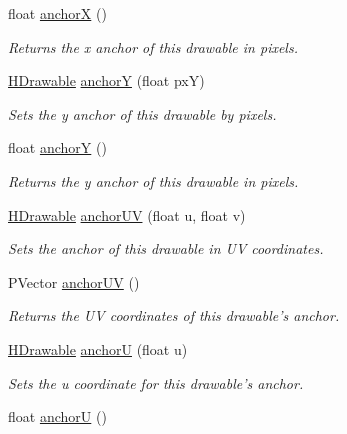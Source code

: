 \begin{DoxyCompactItemize}
float \hyperlink{classhype_1_1core_1_1drawable_1_1_h_drawable_a9bb0273629e7f72853ef8f304bc7f231}{anchor\-X} ()
\begin{DoxyCompactList}\small\item\em Returns the x anchor of this drawable in pixels. \end{DoxyCompactList}\item 
\hyperlink{classhype_1_1core_1_1drawable_1_1_h_drawable}{H\-Drawable} \hyperlink{classhype_1_1core_1_1drawable_1_1_h_drawable_a2e8e72269b9adbd51937bbc8a9dfb3ff}{anchor\-Y} (float px\-Y)
\begin{DoxyCompactList}\small\item\em Sets the y anchor of this drawable by pixels. \end{DoxyCompactList}\item 
float \hyperlink{classhype_1_1core_1_1drawable_1_1_h_drawable_a3fc39833727f9bd6f1c886619fe977f2}{anchor\-Y} ()
\begin{DoxyCompactList}\small\item\em Returns the y anchor of this drawable in pixels. \end{DoxyCompactList}\item 
\hyperlink{classhype_1_1core_1_1drawable_1_1_h_drawable}{H\-Drawable} \hyperlink{classhype_1_1core_1_1drawable_1_1_h_drawable_a1c0b97d90da4d7ee5c396e23f98f6017}{anchor\-U\-V} (float u, float v)
\begin{DoxyCompactList}\small\item\em Sets the anchor of this drawable in U\-V coordinates. \end{DoxyCompactList}\item 
P\-Vector \hyperlink{classhype_1_1core_1_1drawable_1_1_h_drawable_ab19047f4bb1181ccd155741ebe6e501f}{anchor\-U\-V} ()
\begin{DoxyCompactList}\small\item\em Returns the U\-V coordinates of this drawable's anchor. \end{DoxyCompactList}\item 
\hyperlink{classhype_1_1core_1_1drawable_1_1_h_drawable}{H\-Drawable} \hyperlink{classhype_1_1core_1_1drawable_1_1_h_drawable_a612e31b0edd321c75dc48506481cb700}{anchor\-U} (float u)
\begin{DoxyCompactList}\small\item\em Sets the {\ttfamily u} coordinate for this drawable's anchor. \end{DoxyCompactList}\item 
float \hyperlink{classhype_1_1core_1_1drawable_1_1_h_drawable_add9181ba6883afc4a2a4a02a09c7b03f}{anchor\-U} ()

\end{DoxyCompactItemize}

